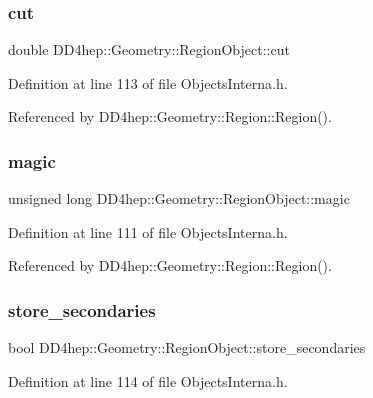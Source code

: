 \subsubsection{\texorpdfstring{cut}{cut}}
{\footnotesize\ttfamily double D\+D4hep\+::\+Geometry\+::\+Region\+Object\+::cut}



Definition at line 113 of file Objects\+Interna.\+h.



Referenced by D\+D4hep\+::\+Geometry\+::\+Region\+::\+Region().

\hypertarget{class_d_d4hep_1_1_geometry_1_1_region_object_aff7bdedd83403e65c3b749c759e30316}{}\label{class_d_d4hep_1_1_geometry_1_1_region_object_aff7bdedd83403e65c3b749c759e30316} 
\subsubsection{\texorpdfstring{magic}{magic}}
{\footnotesize\ttfamily unsigned long D\+D4hep\+::\+Geometry\+::\+Region\+Object\+::magic}



Definition at line 111 of file Objects\+Interna.\+h.



Referenced by D\+D4hep\+::\+Geometry\+::\+Region\+::\+Region().

\hypertarget{class_d_d4hep_1_1_geometry_1_1_region_object_a531d5176989429dfcb6c6cce094ee209}{}\label{class_d_d4hep_1_1_geometry_1_1_region_object_a531d5176989429dfcb6c6cce094ee209} 
\subsubsection{\texorpdfstring{store\+\_\+secondaries}{store\_secondaries}}
{\footnotesize\ttfamily bool D\+D4hep\+::\+Geometry\+::\+Region\+Object\+::store\+\_\+secondaries}



Definition at line 114 of file Objects\+Interna.\+h.



